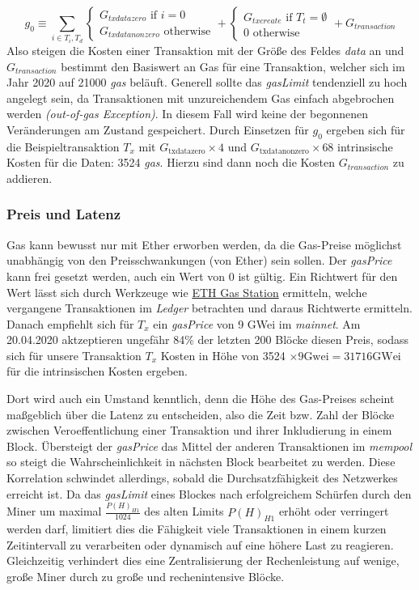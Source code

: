 \documentclass[runningheads]{llncs}
\begin{document}
$$ g_0 \equiv \sum_{i \in T_i, T_d}
  \begin{cases}
    G_{txdatazero} \text{ if } i=0 \\
    G_{txdatanonzero} \text{ otherwise}
  \end{cases}
  +
  \begin{cases}
    G_{txcreate} \text{ if } T_t = \emptyset \\
    0 \text{ otherwise}
  \end{cases}
  +
  G_{transaction}
$$
Also steigen die Kosten einer Transaktion mit der Größe des Feldes \textit{data} an und $ G_{transaction} $ bestimmt den Basiswert an Gas für eine Transaktion, welcher sich im Jahr 2020 auf 21000 \textit{gas} beläuft. Generell sollte das \textit{gasLimit} tendenziell zu hoch angelegt sein, da Transaktionen mit unzureichendem Gas einfach abgebrochen werden \textit{(out-of-gas Exception)}. In diesem Fall wird keine der begonnenen Veränderungen am Zustand gespeichert. Durch Einsetzen für $ g_0 $ ergeben sich für die Beispieltransaktion $ T_x $ mit $ G_{\text{txdatazero}} \times 4 $ und $ G_{\text{txdatanonzero}} \times 68 $ intrinsische Kosten für die Daten: 3524 \textit{gas}. Hierzu sind dann noch die Kosten $ G_{transaction} $ zu addieren. \cite{neemann_appendix_nodate}

\subsubsection{Preis und Latenz}
Gas kann bewusst nur mit Ether erworben werden, da die Gas-Preise möglichst unabhängig von den Preisschwankungen (von Ether) sein sollen. Der \textit{gasPrice} kann frei gesetzt werden, auch ein Wert von 0 ist gültig. Ein Richtwert für den Wert lässt sich durch Werkzeuge wie \href{https://www.ethgasstation.info/}{ETH Gas Station} ermitteln, welche vergangene Transaktionen im \textit{Ledger} betrachten und daraus Richtwerte ermitteln. Danach empfiehlt sich für $ T_x $ ein \textit{gasPrice} von 9 GWei im \textit{mainnet}. Am 20.04.2020 aktzeptieren ungefähr 84\% der letzten 200 Blöcke diesen Preis, sodass sich für unsere Transaktion $ T_x $ Kosten in Höhe von 3524 $ \times 9 \text{Gwei} = 31716 \text{GWei} $ für die intrinsischen Kosten ergeben.

Dort wird auch ein Umstand kenntlich, denn die Höhe des Gas-Preises scheint maßgeblich über die Latenz zu entscheiden, also die Zeit bzw. Zahl der Blöcke zwischen Veroeffentlichung einer Transaktion und ihrer Inkludierung in einem Block. Übersteigt der \textit{gasPrice} das Mittel der anderen Transaktionen im \textit{mempool} so steigt die Wahrscheinlichkeit in nächsten Block bearbeitet zu werden. Diese Korrelation schwindet allerdings, sobald die Durchsatzfähigkeit des Netzwerkes erreicht ist. \cite[S. 30 f.]{pierro_influence_2019} Da das \textit{gasLimit} eines Blockes nach erfolgreichem Schürfen durch den Miner um maximal $ \frac{P(H)_{H1}}{1024} $ des alten Limits  $ P(H)_{H1} $ erhöht oder verringert werden darf, limitiert dies die Fähigkeit viele Transaktionen in einem kurzen Zeitintervall zu verarbeiten oder dynamisch auf eine höhere Last zu reagieren. Gleichzeitig  verhindert dies eine Zentralisierung der Rechenleistung auf wenige, große Miner durch zu große und rechenintensive Blöcke.
\end{document}
